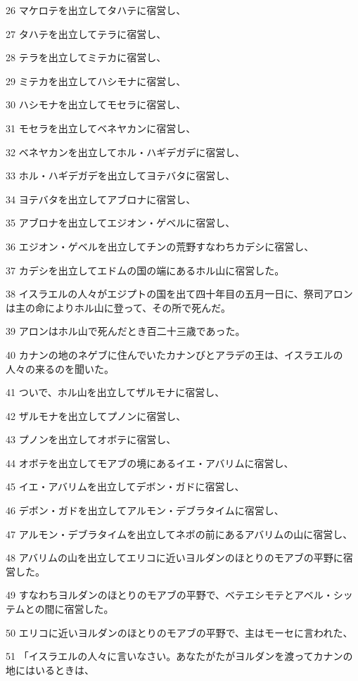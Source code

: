 \par 26 マケロテを出立してタハテに宿営し、
\par 27 タハテを出立してテラに宿営し、
\par 28 テラを出立してミテカに宿営し、
\par 29 ミテカを出立してハシモナに宿営し、
\par 30 ハシモナを出立してモセラに宿営し、
\par 31 モセラを出立してベネヤカンに宿営し、
\par 32 ベネヤカンを出立してホル・ハギデガデに宿営し、
\par 33 ホル・ハギデガデを出立してヨテバタに宿営し、
\par 34 ヨテバタを出立してアブロナに宿営し、
\par 35 アブロナを出立してエジオン・ゲベルに宿営し、
\par 36 エジオン・ゲベルを出立してチンの荒野すなわちカデシに宿営し、
\par 37 カデシを出立してエドムの国の端にあるホル山に宿営した。
\par 38 イスラエルの人々がエジプトの国を出て四十年目の五月一日に、祭司アロンは主の命によりホル山に登って、その所で死んだ。
\par 39 アロンはホル山で死んだとき百二十三歳であった。
\par 40 カナンの地のネゲブに住んでいたカナンびとアラデの王は、イスラエルの人々の来るのを聞いた。
\par 41 ついで、ホル山を出立してザルモナに宿営し、
\par 42 ザルモナを出立してプノンに宿営し、
\par 43 プノンを出立してオボテに宿営し、
\par 44 オボテを出立してモアブの境にあるイエ・アバリムに宿営し、
\par 45 イエ・アバリムを出立してデボン・ガドに宿営し、
\par 46 デボン・ガドを出立してアルモン・デブラタイムに宿営し、
\par 47 アルモン・デブラタイムを出立してネボの前にあるアバリムの山に宿営し、
\par 48 アバリムの山を出立してエリコに近いヨルダンのほとりのモアブの平野に宿営した。
\par 49 すなわちヨルダンのほとりのモアブの平野で、ベテエシモテとアベル・シッテムとの間に宿営した。
\par 50 エリコに近いヨルダンのほとりのモアブの平野で、主はモーセに言われた、
\par 51 「イスラエルの人々に言いなさい。あなたがたがヨルダンを渡ってカナンの地にはいるときは、
